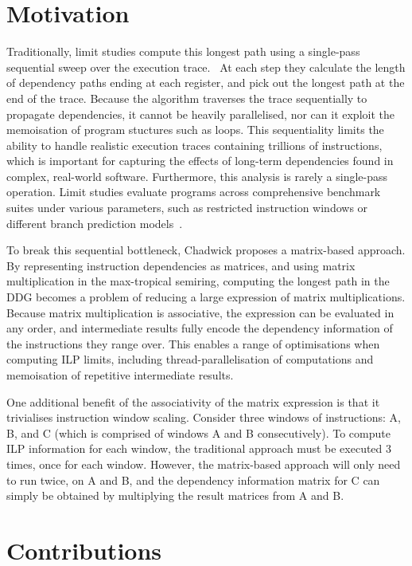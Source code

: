 \section{Motivation} \label{intro:motivation}

Traditionally, limit studies compute this longest path using a single-pass sequential sweep over the execution trace.~\cite{wall-ilp, ilp-spec95, perpi}
At each step they calculate the length of dependency paths ending at each register, and pick out the longest path at the 
end of the trace. Because the algorithm traverses the trace sequentially to propagate
dependencies, it cannot be heavily parallelised, nor can it exploit the memoisation of program stuctures such as loops.
This sequentiality limits the ability to handle realistic execution traces containing trillions of instructions,
which is important for capturing the effects of long-term dependencies found in complex, real-world 
software. Furthermore, this analysis is rarely a single-pass operation. Limit studies evaluate programs across comprehensive 
benchmark suites under various parameters, such as restricted instruction windows or different branch prediction models~\cite{wall-ilp, future-ilp, ilp-spec95}.

To break this sequential bottleneck, Chadwick \cite{Chadderz} proposes a matrix-based approach. By representing instruction 
dependencies as matrices, and using matrix multiplication in the max-tropical semiring, computing the longest path in
the DDG becomes a problem of reducing a large expression of matrix multiplications.
Because matrix multiplication is associative, the expression can be evaluated in any order, and intermediate results 
fully encode the dependency information of the instructions they range over. This enables a range of optimisations when 
computing ILP limits, including thread-parallelisation of computations and memoisation of repetitive intermediate results.

One additional benefit of the associativity of the matrix expression is that it trivialises instruction window scaling.
Consider three windows of instructions: A, B, and C (which is comprised of windows A and B consecutively).
To compute ILP information for each window, the traditional approach must be executed 3 times, once for 
each window. However, the matrix-based approach will only need to run twice, on A and B, and the dependency 
information matrix for C can simply be obtained by multiplying the result matrices from A and B.

\section{Contributions}

